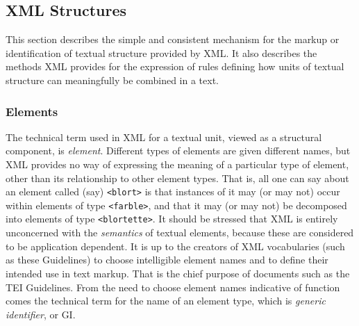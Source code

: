 \subsection[{XML Structures}]{XML Structures}\label{SG13}\par
This section describes the simple and consistent mechanism for the markup or identification of textual structure provided by XML. It also describes the methods XML provides for the expression of rules defining how units of textual structure can meaningfully be combined in a text.
\subsubsection[{Elements}]{Elements}\label{SG131}\par
The technical term used in XML for a textual unit, viewed as a structural component, is \textit{element}. Different types of elements are given different names, but XML provides no way of expressing the meaning of a particular type of element, other than its relationship to other element types. That is, all one can say about an element called (say) \texttt{<blort>} is that instances of it may (or may not) occur within elements of type \texttt{<farble>}, and that it may (or may not) be decomposed into elements of type \texttt{<blortette>}. It should be stressed that XML is entirely unconcerned with the \textit{semantics} of textual elements, because these are considered to be application dependent. It is up to the creators of XML vocabularies (such as these Guidelines) to choose intelligible element names and to define their intended use in text markup. That is the chief purpose of documents such as the TEI Guidelines. From the need to choose element names indicative of function comes the technical term for the name of an element type, which is \textit{generic identifier}, or GI.\par
